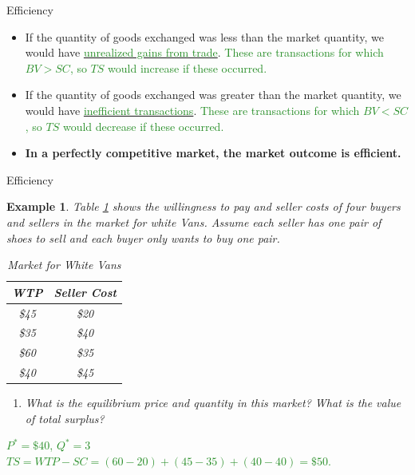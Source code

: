 \documentclass[xcolor={dvipsnames},pdf, hyperref={colorlinks=true, citecolor=ForestGreen, linkcolor=BlueViolet, urlcolor=Magenta}]{beamer}
\newtheorem{exmp}{Example}[section]
\newcommand{\ddp}[1]{{\textcolor{ForestGreen}{#1}}}
\newcommand{\dd}[1]{{\underline{\textcolor{ForestGreen}{#1}}}}
\begin{document}
\begin{frame}{Efficiency}
	
	\begin{itemize}
		\item If the quantity of goods exchanged was less than the market quantity, we would have \dd{unrealized gains from trade}.
		\ddp{These are transactions for which $BV>SC$, so $TS$ would increase if these occurred.}
		\item If the quantity of goods exchanged was greater than the market quantity, we would have \dd{inefficient transactions}.
		\ddp{These are transactions for which $BV<SC$, so $TS$ would decrease if these occurred.}		
		\item \textbf{In a perfectly competitive market, the market outcome is efficient.}
	\end{itemize}
	
\end{frame}


\begin{frame}{Efficiency}
	
	\begin{exmp} 
		\scriptsize
		Table \ref{blahblah} shows the willingness to pay and seller costs of four buyers and sellers in the market for white Vans. Assume each seller has one pair of shoes to sell and each buyer only wants to buy one pair.
		\begin{table}[ht]
			\caption{Market for White Vans}
			\label{blahblah}
			\centering
			\begin{tabular}{ c|c}        
				
				WTP   & Seller Cost \\
				\hline
				\$45 & \$20 \\
				\$35 & \$40 \\
				\$60 & \$35 \\
				\$40 & \$45 \\
			\end{tabular}
		\end{table}
		
		\begin{enumerate}
			\item	What is the equilibrium price and quantity in this market? What is the value of total surplus? 
		\end{enumerate}		
	\end{exmp}
\scriptsize
 \ddp{\pause $P^* = \$40$, $Q^* = 3$
	\\ \pause $TS = WTP - SC = (60 - 20) + (45 - 35) + (40 - 40) = \$50$.}
\end{frame}
\end{document}
